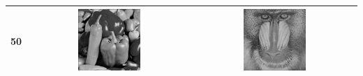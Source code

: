\documentclass{article}
\begin{document}
\begin{center}
\begin{tabular}{@{}c|c|c}
\\ \hline
\textbf{50} & 
\includegraphics[width=0.4\textwidth]{pep50}
&
\includegraphics[width=0.4\textwidth]{bab50}
\\ \hline
\end{tabular}
\hspace*{-2.5cm}
\end{center}
\end{document}
